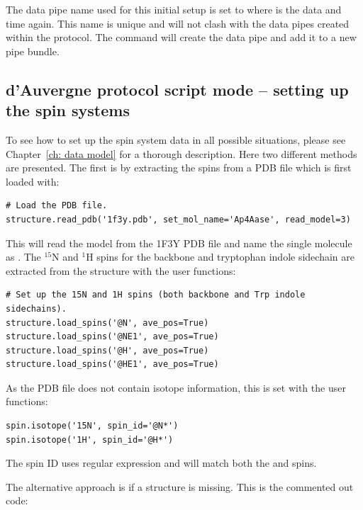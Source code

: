 \begin{htmlonly}
\begin{htmlonly}
The data pipe name used for this initial setup is set to  where  is the data and time again.
This name is unique and will not clash with the data pipes created within the protocol.
The  command will create the data pipe and add it to a new pipe bundle.



\subsection{d'Auvergne protocol script mode -- setting up the spin systems}

To see how to set up the spin system data in all possible situations, please see Chapter~\ref{ch: data model} for a thorough description.
Here two different methods are presented.
The first is by extracting the spins from a PDB file which is first loaded with:

\begin{lstlisting}[firstnumber=161]
# Load the PDB file.
structure.read_pdb('1f3y.pdb', set_mol_name='Ap4Aase', read_model=3)
\end{lstlisting}

This will read the  model from the 1F3Y PDB file and name the single molecule as .
The $^{15}$N and $^1$H spins for the backbone and tryptophan indole sidechain are extracted from the structure with the user functions:

\begin{lstlisting}[firstnumber=164]
# Set up the 15N and 1H spins (both backbone and Trp indole sidechains).
structure.load_spins('@N', ave_pos=True)
structure.load_spins('@NE1', ave_pos=True)
structure.load_spins('@H', ave_pos=True)
structure.load_spins('@HE1', ave_pos=True)
\end{lstlisting}

As the PDB file does not contain isotope information, this is set with the user functions:

\begin{lstlisting}[firstnumber=169]
spin.isotope('15N', spin_id='@N*')
spin.isotope('1H', spin_id='@H*')
\end{lstlisting}

The spin ID  uses regular expression and will match both the  and  spins.

The alternative approach is if a structure is missing.
This is the commented out code:


\end{htmlonly}
\end{htmlonly}
